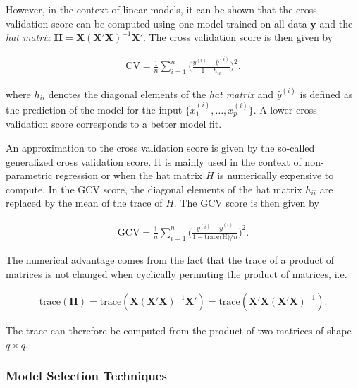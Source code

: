 \documentclass[10pt,a4paper]{article}
\begin{document}
However, in the context of linear models, it can be shown that the cross validation score can be computed using one model trained on all data $\boldsymbol{y}$ and the \emph{hat matrix} $\boldsymbol{H} = \boldsymbol{X}(\boldsymbol{X}'\boldsymbol{X})^{-1}\boldsymbol{X}'$. The cross validation score is then given by

\begin{align} \label{eq:cross-validation}
	\text{CV} = \frac{1}{n} \sum_{i=1}^n\big( \frac{y^{(i)} - \hat y^{(i)}}{1 - h_{ii}}\big)^2.
\end{align}

where $h_{ii}$ denotes the diagonal elements of the \emph{hat matrix} and $\hat y^{(i)}$ is defined as the prediction of the model for the input $\{x^{(i)}_1, \dots, x^{(i)}_p \}$. A lower cross validation score corresponds to a better model fit. \cite{golub1979}

An approximation to the cross validation score is given by the so-called generalized cross validation score. It is mainly used in the context of non-parametric regression or when the hat matrix $H$ is numerically expensive to compute. In the GCV score, the diagonal elements of the hat matrix $h_{ii}$ are replaced by the mean of the trace of $H$. The GCV score is then given by

\begin{align} \label{eq:generalizied-cross-validation}
	\text{GCV} = \frac{1}{n}\sum_{i=1}^n \Big( \frac{y^{(i)} - \hat y^{(i)}}{1 - \text{trace(H)}/n}\Big)^2.
\end{align}

The numerical advantage comes from the fact that the trace of a product of matrices is not changed when cyclically permuting the product of matrices, i.e.

\begin{align}
	\text{trace}(\boldsymbol{H}) = \text{trace}(\boldsymbol{X}(\boldsymbol{X}'\boldsymbol{X})^{-1}\boldsymbol{X}') =\text{trace}(\boldsymbol{X}'\boldsymbol{X}(\boldsymbol{X}'\boldsymbol{X})^{-1}).
\end{align} 
 
The trace can therefore be computed from the product of two matrices of shape $q\times q$. \cite{fahrmeir2013regression}

\subsubsection{Model Selection Techniques} \label{subsubsec:MST}
\end{document}
